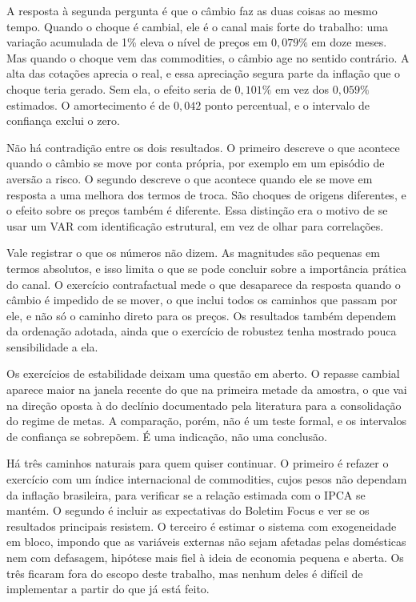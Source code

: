 \documentclass[12pt,openright,oneside,a4paper,portuguese,brazil]{abntex2}
\begin{document}
A resposta à segunda pergunta é que o câmbio faz as duas coisas ao mesmo tempo.
Quando o choque é cambial, ele é o canal mais forte do trabalho: uma variação
acumulada de 1\% eleva o nível de preços em $0{,}079\%$ em doze meses. Mas
quando o choque vem das commodities, o câmbio age no sentido contrário. A alta
das cotações aprecia o real, e essa apreciação segura parte da inflação que o
choque teria gerado. Sem ela, o efeito seria de $0{,}101\%$ em vez dos
$0{,}059\%$ estimados. O amortecimento é de $0{,}042$ ponto percentual, e o
intervalo de confiança exclui o zero.

Não há contradição entre os dois resultados. O primeiro descreve o que acontece
quando o câmbio se move por conta própria, por exemplo em um episódio de
aversão a risco. O segundo descreve o que acontece quando ele se move em
resposta a uma melhora dos termos de troca. São choques de origens diferentes,
e o efeito sobre os preços também é diferente. Essa distinção era o motivo de
se usar um VAR com identificação estrutural, em vez de olhar para correlações.

Vale registrar o que os números não dizem. As magnitudes são pequenas em termos
absolutos, e isso limita o que se pode concluir sobre a importância prática do
canal. O exercício contrafactual mede o que desaparece da resposta quando o
câmbio é impedido de se mover, o que inclui todos os caminhos que passam por
ele, e não só o caminho direto para os preços. Os resultados também dependem da
ordenação adotada, ainda que o exercício de robustez tenha mostrado pouca
sensibilidade a ela.

Os exercícios de estabilidade deixam uma questão em aberto. O repasse cambial
aparece maior na janela recente do que na primeira metade da amostra, o que vai
na direção oposta à do declínio documentado pela literatura para a consolidação
do regime de metas. A comparação, porém, não é um teste formal, e os intervalos
de confiança se sobrepõem. É uma indicação, não uma conclusão.

Há três caminhos naturais para quem quiser continuar. O primeiro é refazer o
exercício com um índice internacional de commodities, cujos pesos não dependam
da inflação brasileira, para verificar se a relação estimada com o IPCA se
mantém. O segundo é incluir as expectativas do Boletim Focus e ver se os
resultados principais resistem. O terceiro é estimar o sistema com exogeneidade
em bloco, impondo que as variáveis externas não sejam afetadas pelas domésticas
nem com defasagem, hipótese mais fiel à ideia de economia pequena e aberta. Os
três ficaram fora do escopo deste trabalho, mas nenhum deles é difícil de
implementar a partir do que já está feito.
\end{document}
